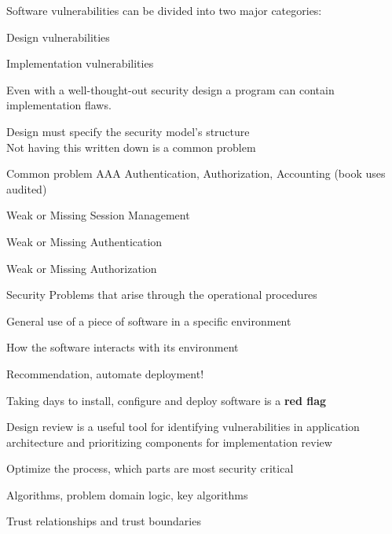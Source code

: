 \documentclass[Screen16to9,17pt]{foils}
\begin{document}

Software vulnerabilities can be divided into two major categories:
\begin{list2}
\item Design vulnerabilities
\item Implementation vulnerabilities
\end{list2}

Even with a well-thought-out security design a program can contain implementation flaws.


\begin{list2}
\item Design must specify the security model's structure\\
Not having this written down is a common problem
\item Common problem AAA Authentication, Authorization, Accounting (book uses audited)
\item Weak or Missing Session Management
\item Weak or Missing Authentication
\item Weak or Missing Authorization
\end{list2}



\begin{list2}
\item Security Problems that arise through the operational procedures
\item General use of a piece of software in a specific environment
\item How the software interacts with its environment
\item Recommendation, automate deployment!
\item Taking days to install, configure and deploy software is a {\bf red flag}
\end{list2}



\begin{list2}
\item Design review is a useful tool for identifying vulnerabilities in application architecture and prioritizing components for implementation review
\item Optimize the process, which parts are most security critical
\item Algorithms, problem domain logic, key algorithms
\item Trust relationships and trust boundaries
\end{list2}
\end{document}
